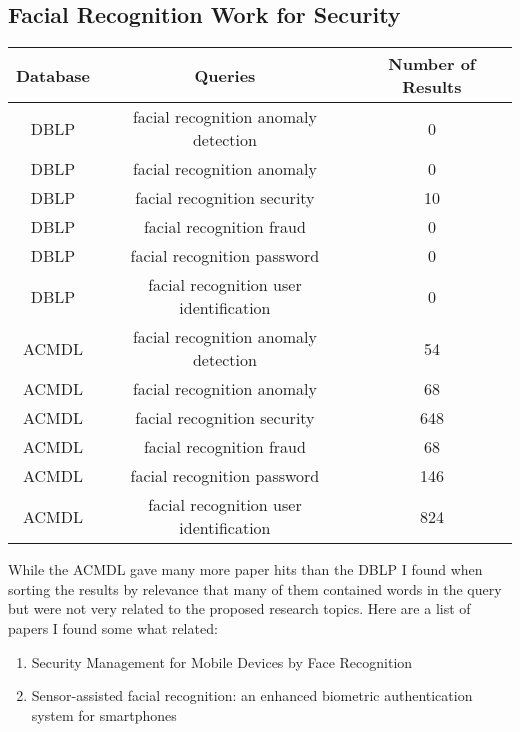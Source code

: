 \documentclass[]{article}
\begin{document}
\subsection*{Facial Recognition Work for Security}
\begin{table}[!htb]
\centering
        \begin{tabular}{|c|c|c|}
        \hline
         Database & Queries & Number of Results \\
         \hline
         DBLP & facial recognition anomaly detection & 0\\
         DBLP & facial recognition anomaly & 0\\
         DBLP & facial recognition security & 10\\
         DBLP & facial recognition fraud & 0\\
         DBLP & facial recognition password & 0\\
         DBLP & facial recognition user identification & 0\\
         ACMDL & facial recognition anomaly detection & 54\\
		 ACMDL & facial recognition anomaly & 68\\
	 	 ACMDL & facial recognition security & 648\\
		 ACMDL & facial recognition fraud & 68\\
		 ACMDL & facial recognition password & 146\\
		 ACMDL & facial recognition user identification & 824\\
        \hline
        \end{tabular}
\end{table}

While the ACMDL gave many more paper hits than the DBLP I found when sorting the results by relevance that many of them contained words in the query but were not very related to the proposed research topics. Here are a list of papers I found some what related:
\begin{enumerate}
\item{Security Management for Mobile Devices by Face Recognition}
\item{Sensor-assisted facial recognition: an enhanced biometric authentication system for smartphones}
\end{enumerate}

\pagebreak
\end{document}
